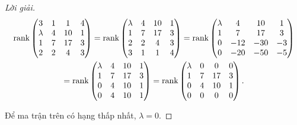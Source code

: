 \documentclass[class=linearalgebra,crop=false]{standalone}
\begin{document}
\begin{proof}[Lời giải]
    \begingroup
    \allowdisplaybreaks
    \begin{gather*}
        \text{rank}\begin{pmatrix}
            3       & 1 & 1  & 4 \\
            \lambda & 4 & 10 & 1 \\
            1       & 7 & 17 & 3 \\
            2       & 2 & 4  & 3
        \end{pmatrix}
        =\text{rank}\begin{pmatrix}
            \lambda & 4 & 10 & 1 \\
            1       & 7 & 17 & 3 \\
            2       & 2 & 4  & 3 \\
            3       & 1 & 1  & 4 \\
        \end{pmatrix}
        =\text{rank}\begin{pmatrix}
            \lambda & 4   & 10  & 1  \\
            1       & 7   & 17  & 3  \\
            0       & -12 & -30 & -3 \\
            0       & -20 & -50 & -5 \\
        \end{pmatrix} \\
        =\text{rank}\begin{pmatrix}
            \lambda & 4 & 10 & 1 \\
            1       & 7 & 17 & 3 \\
            0       & 4 & 10 & 1 \\
            0       & 4 & 10 & 1 \\
        \end{pmatrix}
        =\text{rank}\begin{pmatrix}
            \lambda & 0 & 0  & 0 \\
            1       & 7 & 17 & 3 \\
            0       & 4 & 10 & 1 \\
            0       & 0 & 0  & 0 \\
        \end{pmatrix}.
    \end{gather*}
    \endgroup
    \par Để ma trận trên có hạng thấp nhất, $\lambda = 0$.
\end{proof}
\end{document}
